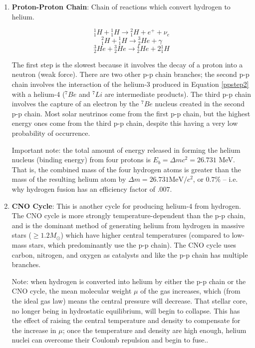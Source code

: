  \begin{enumerate}
 \item \textbf{Proton-Proton Chain}: Chain of reactions which convert hydrogen to helium.
 
 \begin{equation}
 ^1_1H + \text{}^1_1H \rightarrow \text{}^2_1H + e^{+} + \nu_{e}
 \end{equation}
 \begin{equation}\label{ppstep2}
 ^2_1H + \text{}^1_1H \rightarrow \text{}^3_2He + \gamma
 \end{equation}
 \begin{equation}
 ^3_2He + \text{}^3_2He \rightarrow \text{}^4_2He + 2\text{}^1_1H
 \end{equation}
 
 The first step is the slowest because it involves the decay of a proton into a neutron (weak force).  There are two other p-p chain branches; the second p-p chain involves the interaction of the helium-3 produced in Equation \ref{ppstep2} with a helium-4 ($^7Be$ and $^7Li$ are intermediate products).  The third p-p chain involves the capture of an electron by the $^7Be$ nucleus created in the second p-p chain.  Most solar neutrinos come from the first p-p chain, but the highest energy ones come from the third p-p chain, despite this having a very low probability of occurrence.
 
 Important note: the total amount of energy released in forming the helium nucleus (binding energy) from four protons is $E_{b} = \Delta mc^2 = 26.731$ MeV.  That is, the combined mass of the four hydrogen atoms is greater than the mass of the resulting helium atom by $\Delta m = 26.731\text{MeV}/c^2$, or $0.7\%$ -- i.e. why hydrogen fusion has an efficiency factor of $.007$.
 
 \item \textbf{CNO Cycle}: This is another cycle for producing helium-4 from hydrogen.  The CNO cycle is more strongly temperature-dependent than the p-p chain, and is the dominant method of generating helium from hydrogen in massive stars ($\geq 1.2 M_{\odot}$) which have higher central temperatures (compared to low-mass stars, which predominantly use the p-p chain).  The CNO cycle uses carbon, nitrogen, and oxygen as catalysts and like the p-p chain has multiple branches.
 
Note: when hydrogen is converted into helium by either the p-p chain or the CNO cycle, the mean molecular weight $\mu$ of the gas increases, which (from the ideal gas law) means the central pressure will decrease.  That stellar core, no longer being in hydrostatic equilibrium, will begin to collapse.  This has the effect of raising the central temperature and density to compensate for the increase in $\mu$; once the temperature and density are high enough, helium nuclei can overcome their Coulomb repulsion and begin to fuse..
 

\end{enumerate}
